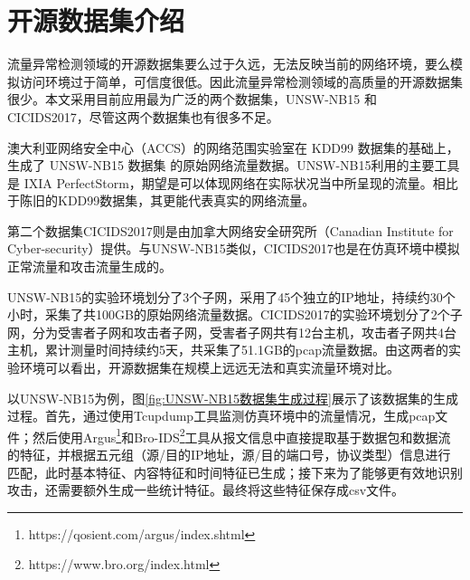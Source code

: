 
\section{开源数据集介绍}
流量异常检测领域的开源数据集要么过于久远，无法反映当前的网络环境，要么模拟访问环境过于简单，可信度很低。因此流量异常检测领域的高质量的开源数据集很少。本文采用目前应用最为广泛的两个数据集，UNSW-NB15 和 CICIDS2017，尽管这两个数据集也有很多不足。

澳大利亚网络安全中心（ACCS）的网络范围实验室在 KDD99 数据集的基础上，生成了 UNSW-NB15 数据集\cite{moustafa2015unsw} 的原始网络流量数据。UNSW-NB15利用的主要工具是 IXIA PerfectStorm，期望是可以体现网络在实际状况当中所呈现的流量。相比于陈旧的KDD99数据集\cite{ozgur2016review}，其更能代表真实的网络流量。

第二个数据集CICIDS2017则是由加拿大网络安全研究所（Canadian Institute for Cyber-security）提供。与UNSW-NB15类似，CICIDS2017也是在仿真环境中模拟正常流量和攻击流量生成的。

UNSW-NB15的实验环境划分了3个子网，采用了45个独立的IP地址，持续约30个小时，采集了共100GB的原始网络流量数据。CICIDS2017的实验环境划分了2个子网，分为受害者子网和攻击者子网，受害者子网共有12台主机，攻击者子网共4台主机，累计测量时间持续约5天，共采集了51.1GB的pcap流量数据。由这两者的实验环境可以看出，开源数据集在规模上远远无法和真实流量环境对比。




以UNSW-NB15为例，图\ref{fig:UNSW-NB15数据集生成过程}展示了该数据集的生成过程。首先，通过使用Tcupdump工具监测仿真环境中的流量情况，生成pcap文件；然后使用Argus\footnote{https://qosient.com/argus/index.shtml}和Bro-IDS\footnote{https://www.bro.org/index.html}工具从报文信息中直接提取基于数据包和数据流的特征，并根据五元组（源/目的IP地址，源/目的端口号，协议类型）信息进行匹配，此时基本特征、内容特征和时间特征已生成；接下来为了能够更有效地识别攻击，还需要额外生成一些统计特征。最终将这些特征保存成csv文件。



